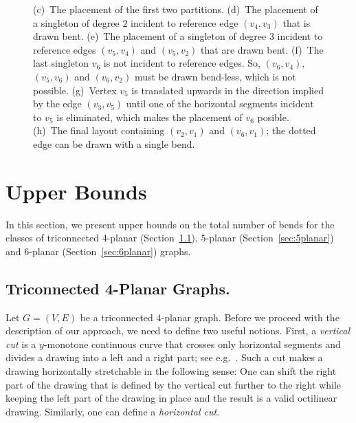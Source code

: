 \documentclass[a4paper,twoside,11pt]{article}
\begin{document}
\begin{figure}[tb]
{    (c)~The placement of the first two partitions.
    (d)~The placement of a singleton of degree $2$ incident to reference edge $(v_4,v_3)$ that is drawn bent.
    (e)~The placement of a singleton of degree $3$ incident to reference edges $(v_5,v_4)$ and $(v_5,v_2)$ that are drawn bent.
    (f)~The last singleton $v_6$ is not incident to reference edges. So, $(v_6,v_4)$, $(v_5,v_6)$ and $(v_6,v_2)$ must be drawn bend-less, which is not possible.
    (g)~Vertex $v_5$ is translated upwards in the direction implied by the edge $(v_3,v_5)$ until one of the horizontal segments incident to $v_5$ is eliminated, which makes the placement of $v_6$ posible.
    (h)~The final layout containing $(v_2,v_1)$ and $(v_6,v_1)$; the dotted edge can be drawn with a single bend.}
    \label{fig:4p_example} 
\end{figure} 

\section{Upper Bounds}
\label{sec:upperbounds}


In this section, we present upper bounds on the total number of
bends for the classes of triconnected $4$-planar
(Section~\ref{sec:4planar}), $5$-planar (Section~\ref{sec:5planar})
and $6$-planar (Section~\ref{sec:6planar}) graphs.

\subsection{Triconnected 4-Planar Graphs.}
\label{sec:4planar}


Let $G=(V,E)$ be a triconnected $4$-planar graph. Before we proceed
with the description of our approach, we need to define two useful
notions. First, a \emph{vertical cut} is a $y$-monotone continuous
curve that crosses only horizontal segments and divides a drawing
into a left and a right part; see e.g.~\cite{FCK98}. Such a cut
makes a drawing horizontally stretchable in the following sense: One
can shift the right part of the drawing that is defined by the
vertical cut further to the right while keeping the left part of
the drawing in place and the result is a valid octilinear drawing.
Similarly, one can define a \emph{horizontal cut}. 
\end{document}
